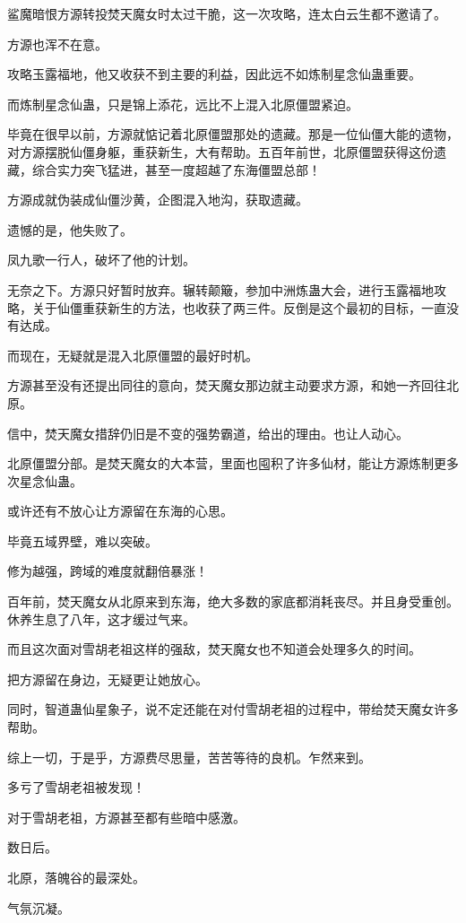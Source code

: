\begin{this_body}
鲨魔暗恨方源转投焚天魔女时太过干脆，这一次攻略，连太白云生都不邀请了。

方源也浑不在意。

攻略玉露福地，他又收获不到主要的利益，因此远不如炼制星念仙蛊重要。

而炼制星念仙蛊，只是锦上添花，远比不上混入北原僵盟紧迫。

毕竟在很早以前，方源就惦记着北原僵盟那处的遗藏。那是一位仙僵大能的遗物，对方源摆脱仙僵身躯，重获新生，大有帮助。五百年前世，北原僵盟获得这份遗藏，综合实力突飞猛进，甚至一度超越了东海僵盟总部！

方源成就伪装成仙僵沙黄，企图混入地沟，获取遗藏。

遗憾的是，他失败了。

凤九歌一行人，破坏了他的计划。

无奈之下。方源只好暂时放弃。辗转颠簸，参加中洲炼蛊大会，进行玉露福地攻略，关于仙僵重获新生的方法，也收获了两三件。反倒是这个最初的目标，一直没有达成。

而现在，无疑就是混入北原僵盟的最好时机。

方源甚至没有还提出同往的意向，焚天魔女那边就主动要求方源，和她一齐回往北原。

信中，焚天魔女措辞仍旧是不变的强势霸道，给出的理由。也让人动心。

北原僵盟分部。是焚天魔女的大本营，里面也囤积了许多仙材，能让方源炼制更多次星念仙蛊。

或许还有不放心让方源留在东海的心思。

毕竟五域界壁，难以突破。

修为越强，跨域的难度就翻倍暴涨！

百年前，焚天魔女从北原来到东海，绝大多数的家底都消耗丧尽。并且身受重创。休养生息了八年，这才缓过气来。

而且这次面对雪胡老祖这样的强敌，焚天魔女也不知道会处理多久的时间。

把方源留在身边，无疑更让她放心。

同时，智道蛊仙星象子，说不定还能在对付雪胡老祖的过程中，带给焚天魔女许多帮助。

综上一切，于是乎，方源费尽思量，苦苦等待的良机。乍然来到。

多亏了雪胡老祖被发现！

对于雪胡老祖，方源甚至都有些暗中感激。

数日后。

北原，落魄谷的最深处。

气氛沉凝。


\end{this_body}
